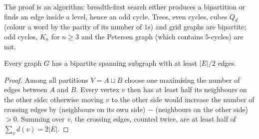 The proof is an algorithm: breadth-first search either produces a bipartition or finds an edge inside a level, hence an odd cycle. Trees, even cycles, cubes $Q_d$ (colour a word by the parity of
its number of $1$s) and grid graphs are bipartite; odd cycles, $K_n$ for $n \geq 3$ and the Petersen graph (which contains $5$-cycles) are not.

\begin{proposition}\label{graph-theory:proposition-bipartite-subgraph}
Every graph $G$ has a bipartite spanning subgraph with at least $|E|/2$ edges.
\end{proposition}

\begin{proof}
Among all partitions $V = A \sqcup B$ choose one maximising the number of edges between $A$ and $B$. Every vertex $v$ then has at least half its neighbours on the other side: otherwise moving $v$ to
the other side would increase the number of crossing edges by (neighbours on its own side) $-$ (neighbours on the other side) $> 0$. Summing over $v$, the crossing edges, counted twice, are at least
half of $\sum_vd(v) = 2|E|$.
\end{proof}
